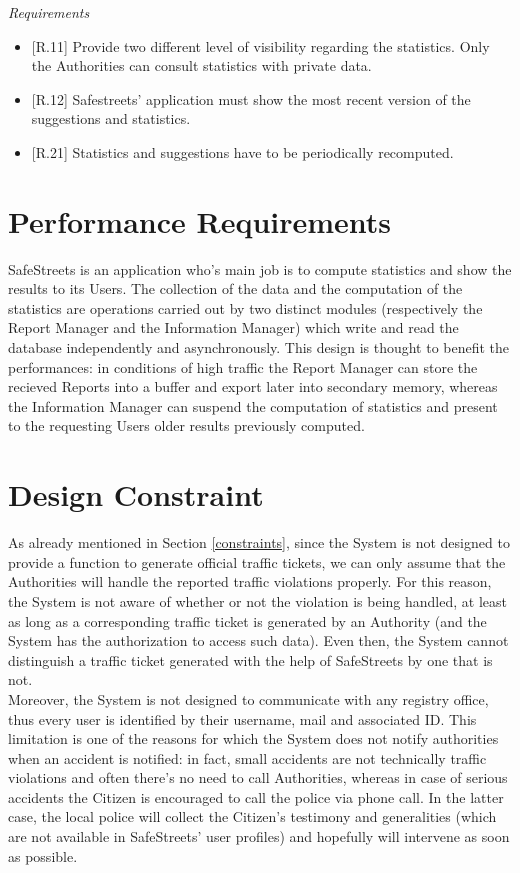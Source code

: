 \documentclass{report}
\begin{document}
\begin{itemize}
\begin{center}\large{\textit{Requirements}}\end{center}
	\begin{itemize}
		\item {[R.11]}
		Provide two different level of visibility regarding the statistics. Only the Authorities can consult statistics with private data.
		\item {[R.12]} Safestreets' application must show the most recent version of the suggestions and statistics.
		\item {[R.21]} Statistics and suggestions have to be periodically recomputed.
	\end{itemize}
\end{itemize}

\newpage

\section{Performance Requirements}
SafeStreets is an application who's main job is to compute statistics and show the results to its Users. The collection of the data and the computation of the statistics are operations carried out by two distinct modules (respectively the Report Manager and the Information Manager) which write and read the database independently and asynchronously. This design is thought to benefit the performances: in conditions of high traffic the Report Manager can store the recieved Reports into a buffer and export later into secondary memory, whereas the Information Manager can suspend the computation of statistics and present to the requesting Users older results previously computed.
\section{Design Constraint}
As already mentioned in Section \ref{constraints}, since the System is not designed to provide a function to generate official traffic tickets, we can only assume that the Authorities will handle the reported traffic violations properly. For this reason, the System is not aware of whether or not the violation is being handled, at least as long as a corresponding traffic ticket is generated by an Authority (and the System has the authorization to access such data). Even then, the System cannot distinguish a traffic ticket generated with the help of SafeStreets by one that is not.
\\
Moreover, the System is not designed to communicate with any registry office, thus every user is identified by their username, mail and associated ID. This limitation is one of the reasons for which the System does not notify authorities when an accident is notified: in fact, small accidents are not technically traffic violations and often there's no need to call Authorities, whereas in case of serious accidents the Citizen is encouraged to call the police via phone call. In the latter case, the local police will collect the Citizen's testimony and generalities (which are not available in SafeStreets' user profiles) and hopefully will intervene as soon as possible. 
\end{document}
